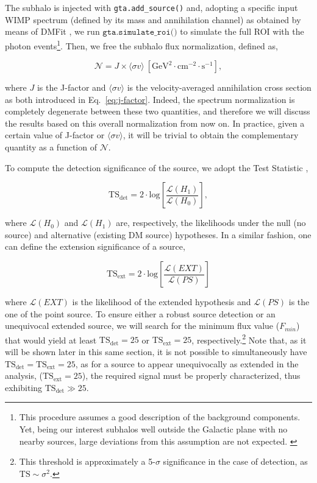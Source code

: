 \documentclass[%
 reprint,
nofootinbib,
 amsmath,amssymb,
 aps,
]{revtex4-2}
\begin{document}
The subhalo is injected with \texttt{gta.add\_source()} and, adopting a specific input WIMP spectrum (defined by its mass and annihilation channel) as obtained by means of DMFit \cite{Jeltema2008}, we run \texttt{$\mathrm{\texttt{gta.simulate\_roi()}}$} to simulate the full ROI with the photon events\footnote{This procedure assumes a good description of the background components. Yet, being our interest subhalos well outside the Galactic plane with no nearby sources, large deviations from this assumption are not expected. \label{foot:injection}}. Then, we free the subhalo flux normalization, defined as,

\begin{equation}
\label{eq:normalization}
\mathcal{N}=J \times \langle\sigma v\rangle~\left[\mathrm{GeV^2\cdot cm^{-2}\cdot s^{-1}}\right],
\end{equation}

\noindent where $J$ is the J-factor and $\langle\sigma v\rangle$ is the velocity-averaged annihilation cross section as both introduced in Eq.~\ref{eq:j-factor}. Indeed, the spectrum normalization is completely degenerate between these two quantities, and therefore we will discuss the results based on this overall normalization from now on. In practice, given a certain value of J-factor or $\langle\sigma v\rangle$, it will be trivial to obtain the complementary quantity as a function of $\mathcal{N}$.


To compute the detection significance of the source, we adopt the Test Statistic \cite{Rico_2020},

\begin{equation}
\label{eq:TS_det}
\mathrm{TS_{det}}=2\cdot\textrm{log}\left[\frac{\mathcal{L}(H_1)}{\mathcal{L}(H_0)}\right],
\end{equation}

\noindent where $\mathcal{L}(H_0)$ and $\mathcal{L}(H_1)$ are, respectively, the likelihoods under the null (no source) and alternative (existing DM source) hypotheses. In a similar fashion, one can define the extension significance of a source,

\begin{equation}
\label{eq:TS_ext}
\mathrm{TS_{ext}}=2\cdot\textrm{log}\left[\frac{\mathcal{L}(EXT)}{\mathcal{L}(PS)}\right]
\end{equation}

\noindent where $\mathcal{L}(EXT)$ is the likelihood of the extended hypothesis and $\mathcal{L}(PS)$ is the one of the point source. To ensure either a robust source detection or an unequivocal extended source, we will search for the minimum flux value ($F_{min}$) that would yield at least $\mathrm{TS_{det}}=25$ or $\mathrm{TS_{ext}}=25$, respectively.\footnote{This threshold is approximately a 5-$\sigma$ significance in the case of detection, as $\textrm{TS}\sim\sigma^2$.} Note that, as it will be shown later in this same section, it is not possible to simultaneously have $\mathrm{TS_{det}=TS_{ext}}=25$, as for a source to appear unequivocally as extended in the analysis, ($\mathrm{TS_{ext}}=25$), the required signal must be properly characterized, thus exhibiting $\mathrm{TS_{det}}\gg25$.
\end{document}
